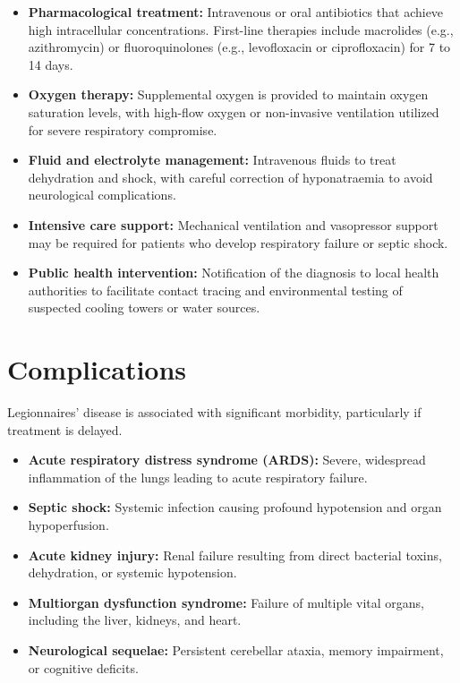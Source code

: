 \begin{itemize}
    \item \textbf{Pharmacological treatment:} Intravenous or oral antibiotics that achieve high intracellular concentrations. First-line therapies include macrolides (e.g., azithromycin) or fluoroquinolones (e.g., levofloxacin or ciprofloxacin) for 7 to 14 days.
    \item \textbf{Oxygen therapy:} Supplemental oxygen is provided to maintain oxygen saturation levels, with high-flow oxygen or non-invasive ventilation utilized for severe respiratory compromise.
    \item \textbf{Fluid and electrolyte management:} Intravenous fluids to treat dehydration and shock, with careful correction of hyponatraemia to avoid neurological complications.
    \item \textbf{Intensive care support:} Mechanical ventilation and vasopressor support may be required for patients who develop respiratory failure or septic shock.
    \item \textbf{Public health intervention:} Notification of the diagnosis to local health authorities to facilitate contact tracing and environmental testing of suspected cooling towers or water sources.
\end{itemize}

\section*{Complications}
Legionnaires' disease is associated with significant morbidity, particularly if treatment is delayed.

\begin{itemize}
    \item \textbf{Acute respiratory distress syndrome (ARDS):} Severe, widespread inflammation of the lungs leading to acute respiratory failure.
    \item \textbf{Septic shock:} Systemic infection causing profound hypotension and organ hypoperfusion.
    \item \textbf{Acute kidney injury:} Renal failure resulting from direct bacterial toxins, dehydration, or systemic hypotension.
    \item \textbf{Multiorgan dysfunction syndrome:} Failure of multiple vital organs, including the liver, kidneys, and heart.
    \item \textbf{Neurological sequelae:} Persistent cerebellar ataxia, memory impairment, or cognitive deficits.
\end{itemize}

